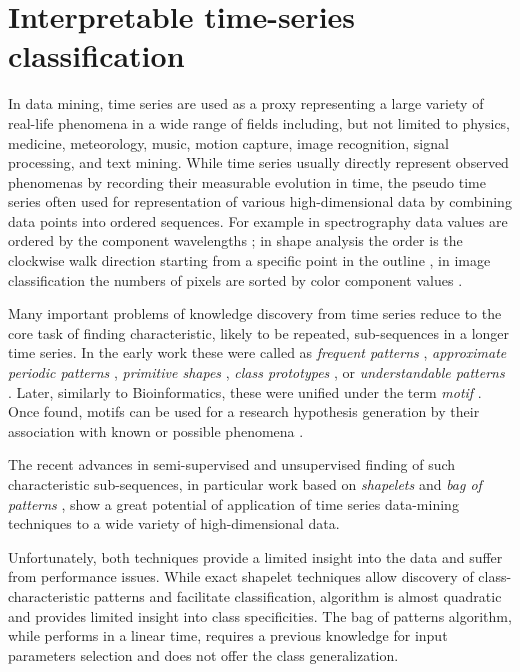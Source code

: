 %
%
\section{Interpretable time-series classification}\label{sec_knowledge_discovery}
In data mining, time series are used as a proxy representing a large variety of real-life phenomena 
in a wide range of fields including, but not limited to physics, medicine, meteorology, music, 
motion capture, image recognition, signal processing, and text mining. 
While time series usually directly represent observed phenomenas by recording their measurable evolution 
in time, the pseudo time series often used for representation of various high-dimensional data 
by combining data points into ordered sequences. 
For example in spectrography data values are ordered by the component wavelengths \cite{citeulike:12550833};
in shape analysis the order is the clockwise walk direction starting from a specific point in the outline 
\cite{citeulike:12550835}, in image classification the numbers of pixels are sorted by color component 
values \cite{citeulike:2900542}.

Many important problems of knowledge discovery from time series reduce to the core task of finding 
characteristic, likely to be repeated, sub-sequences in a longer time series. 
In the early work these were called as 
\textit{frequent patterns} \cite{citeulike:5159615}, 
\textit{approximate periodic patterns} \cite{citeulike:1959582},
\textit{primitive shapes} \cite{citeulike:5898869}, 
\textit{class prototypes} \cite{citeulike:4406444}, 
or \textit{understandable patterns} \cite{citeulike:3978076}. 
Later, similarly to Bioinformatics, these were unified under the term \textit{motif} \cite{citeulike:3977965}.
Once found, motifs can be used for a research hypothesis generation by their association with known
or possible phenomena \cite{citeulike:3977965}. 

The recent advances in semi-supervised and unsupervised finding of such characteristic sub-sequences, 
in particular work based on \textit{shapelets} \cite{citeulike:7344347} \cite{citeulike:11957982}
\cite{citeulike:12552293} and \textit{bag of patterns} \cite{citeulike:10525778}, show a great potential 
of application of time series data-mining techniques to a wide variety of high-dimensional data.

Unfortunately, both techniques provide a limited insight into the data and suffer from performance issues. 
While exact shapelet techniques allow discovery of class-characteristic patterns and facilitate classification,
algorithm is almost quadratic and provides limited insight into class specificities. 
The bag of patterns algorithm, while performs in a linear time, requires a previous knowledge for input parameters 
selection and does not offer the class generalization.

